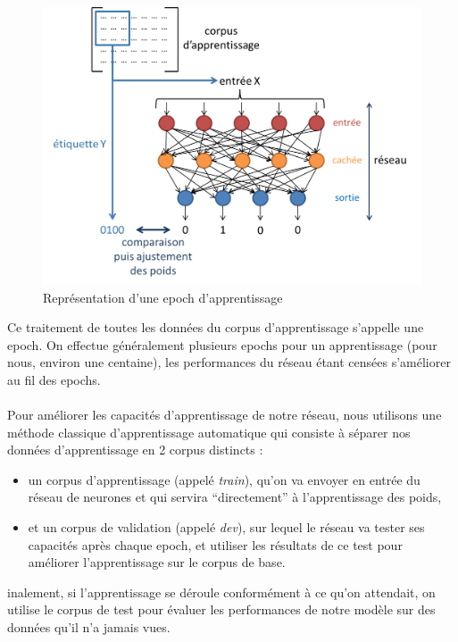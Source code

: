 \documentclass{article}
\begin{document}
\hphantom{.}
\begin{figure}[h]
  \centerline{\includegraphics[scale=0.6]{img/schema_epoch.png}}
  \caption{Représentation d'une epoch d'apprentissage}
\end{figure}

\noindent Ce traitement de toutes les données du corpus d'apprentissage s'appelle une epoch. On effectue généralement plusieurs epochs pour un apprentissage (pour nous, environ une centaine), les performances du réseau étant censées s'améliorer au fil des epochs. \\
 \\
Pour améliorer les capacités d'apprentissage de notre réseau, nous utilisons une méthode classique d'apprentissage automatique qui consiste à séparer nos données d'apprentissage en 2 corpus distincts : 

\begin{itemize}
\item un corpus d'apprentissage (appelé \textit{train}), qu'on va envoyer en entrée du réseau de neurones et qui servira ``directement'' à l'apprentissage des poids,
\item et un corpus de validation (appelé \textit{dev}), sur lequel le réseau va tester ses capacités après chaque epoch, et utiliser les résultats de ce test pour améliorer l'apprentissage sur le corpus de base.
\end{itemize}

\noindent inalement, si l'apprentissage se déroule conformément à ce qu'on attendait, on utilise le corpus de test pour évaluer les performances de notre modèle sur des données qu'il n'a jamais vues.
\newpage
\end{document}
